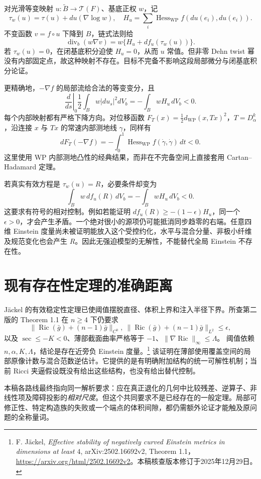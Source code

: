 \documentclass[UTF8,fontset=fandol,zihao=-4,oneside,openany]{ctexbook}
\theoremstyle{cjkplain}
\numberwithin{equation}{chapter}
\DeclareMathOperator{\Ric}{Ric}
\begin{document}
对光滑等变映射 $u:\widetilde B\to\mathcal T(F)$、基底正权 $w$，记
\[
\tau_w(u)=\tau(u)+du(\nabla\log w),\quad
H_u=\sum_i\operatorname{Hess}_{\mathrm{WP}}f(du(e_i),du(e_i)).
\]
不变函数 $v=f\circ u$ 下降到 $B$，链式法则给
\begin{equation}\label{GLB:WPsource}
\operatorname{div}_b(w\nabla v)
=w\{H_u+df_u(\tau_w(u))\}.
\end{equation}
若 $\tau_w(u)=0$，在闭基底积分迫使 $H_u=0$，从而 $u$ 常值。但非零 Dehn twist 幂没有内部固定点，故这种映射不存在。目标不完备不影响这段局部微分与闭基底积分论证。

更精确地，$-\nabla f$ 的局部流给合法的等变变分，且
\[
\left.\frac d{ds}\right|_0\frac12\int_Bw|du_s|^2dV_b
=-\int_BwH_u\,dV_b<0.
\]
每个内部映射都有严格下降方向。对位移函数
$F_T(x)=\frac12d_{\mathrm{WP}}(x,Tx)^2$，$T=D_\alpha^k$，沿连接 $x$ 与 $Tx$ 的常速内部测地线 $\gamma$，同样有
\[
dF_T(-\nabla f)=-\int_0^1\operatorname{Hess}_{\mathrm{WP}}f(\dot\gamma,\dot\gamma)\,dt<0.
\]
这里使用 WP 内部测地凸性的经典结果，而非在不完备空间上直接套用 Cartan--Hadamard 定理。

若真实有效方程是 $\tau_w(u)=R$，必要条件却变为
\begin{equation}\label{GLB:WPbalance}
\int_B w\,df_u(R)\,dV_b=-\int_BwH_u\,dV_b<0.
\end{equation}
这要求有符号的相对控制。例如若能证明
$df_u(R)\ge-(1-\epsilon)H_u$，同一个 $\epsilon>0$，才会产生矛盾。一个绝对很小的源项仍可能抵消同步趋零的右端。任意四维 Einstein 度量尚未被证明能放入这个受控约化，水平与混合分量、非极小纤维及规范变化也会产生 $R$。因此无强迫模型的无解性，不能替代全局 Einstein 不存在性。

\clearpage
\section{现有存在性定理的准确距离}
Jäckel 的有效稳定性定理已使阈值摆脱直径、体积上界和注入半径下界。所查第二版的 Theorem 1.1 在 $n\ge4$ 下仍要求
\[
\|\Ric(\bar g)+(n-1)\bar g\|_{C^0},\ 
\|\Ric(\bar g)+(n-1)\bar g\|_{L^2}\le\epsilon,
\]
以及 $\sec\le-K<0$、薄部截面曲率严格等于 $-1$、$\|\nabla\Ric\|_\infty\le\Lambda$。
阈值依赖 $n,\alpha,K,\Lambda$，结论是存在近旁负 Einstein 度量。\footnote{F. Jäckel, \emph{Effective stability of negatively curved Einstein metrics in dimensions at least $4$}, arXiv:2502.16692v2, Theorem 1.1，\url{https://arxiv.org/html/2502.16692v2}。本稿核查版本修订于2025年12月29日。}
该证明在薄部使用覆盖空间的局部原像计数与混合范数逆估计。它提供的是有明确附加结构的统一可解性机制；当前 Ricci 夹逼假设既没有给出这些结构，也没有给出替代控制。

本稿各路线最终指向同一解析要求：应在真正退化的几何中比较残差、逆算子、非线性项及障碍投影的\emph{相对尺度}。但这个共同要求不是已经存在的一般定理。局部可修正性、特定构造族的失败或一个端点的体积间隙，都仍需额外论证才能触及原问题的全称量词。
\end{document}
